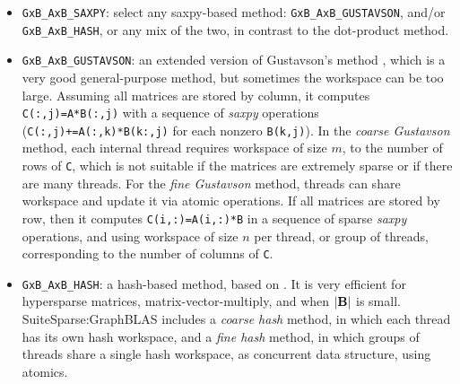 \documentclass[12pt]{article}
\begin{document}
\begin{itemize}
\begin{itemize}
    \item \verb'GxB_AxB_SAXPY': select any saxpy-based method:
        \verb'GxB_AxB_GUSTAVSON', and/or
        \verb'GxB_AxB_HASH', or any mix of the two,
        in contrast to the dot-product method.

    \item \verb'GxB_AxB_GUSTAVSON':  an extended version of Gustavson's method
    \cite{Gustavson78}, which is a very good general-purpose method, but
    sometimes the workspace can be too large.  Assuming all matrices are stored
    by column, it computes \verb'C(:,j)=A*B(:,j)' with a sequence of {\em
    saxpy} operations (\verb'C(:,j)+=A(:,k)*B(k:,j)' for each nonzero
    \verb'B(k,j)').  In the {\em coarse Gustavson} method, each internal thread
    requires workspace of size $m$, to the number of rows of \verb'C', which is
    not suitable if the matrices are extremely sparse or if there are many
    threads.  For the {\em fine Gustavson} method, threads can share workspace
    and update it via atomic operations.  If all matrices are stored by row,
    then it computes \verb'C(i,:)=A(i,:)*B' in a sequence of sparse {\em saxpy}
    operations, and using workspace of size $n$ per thread, or group of
    threads, corresponding to the number of columns of \verb'C'.

    \item \verb'GxB_AxB_HASH':  a hash-based method, based on
        \cite{10.1145/3229710.3229720}.  It is very efficient for hypersparse
        matrices, matrix-vector-multiply, and when $|{\bf B}|$ is small.
        SuiteSparse:GraphBLAS includes a {\em coarse hash} method, in which
        each thread has its own hash workspace, and a {\em fine hash}
        method, in which groups of threads share a single hash workspace,
        as concurrent data structure, using atomics.



\end{itemize}
\end{itemize}
\end{document}

